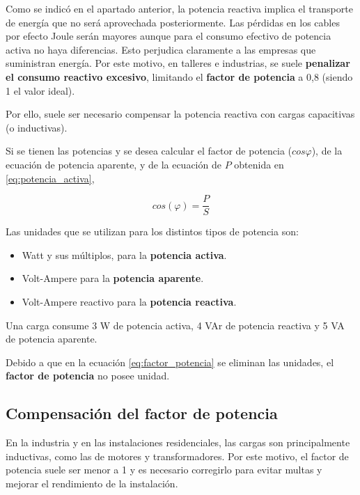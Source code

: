 Como se indicó en el apartado anterior, la potencia reactiva implica el transporte de energía que no será aprovechada posteriormente. Las pérdidas en los cables por efecto Joule serán mayores aunque para el consumo efectivo de potencia activa no haya diferencias. Esto perjudica claramente a las empresas que suministran energía. Por este motivo, en talleres e industrias, se suele \textbf{penalizar el consumo reactivo excesivo}, limitando el \textbf{factor de potencia} a 0,8 (siendo 1 el valor ideal).

Por ello, suele ser necesario compensar la potencia reactiva con cargas capacitivas (o inductivas).


Si se tienen las potencias y se desea calcular el factor de potencia ($cos \varphi$), de la ecuación de potencia aparente, y de la ecuación de $P$ obtenida en \ref{eq:potencia_activa}, 

\begin{equation}
	\label{eq:factor_potencia}
	cos(\varphi)= \frac{P}{S}
\end{equation}

Las unidades que se utilizan para los distintos tipos de potencia son:
\begin{itemize}
	\item Watt y sus múltiplos, para la \textbf{potencia activa}.
	\item Volt-Ampere para la \textbf{potencia aparente}.
	\item Volt-Ampere reactivo para la \textbf{potencia reactiva}.
\end{itemize}

\begin{ejemplo}
	Una carga consume 3 W de potencia activa, 4 VAr de potencia reactiva y 5 VA de potencia aparente.
\end{ejemplo}

Debido a que en la ecuación \ref{eq:factor_potencia} se eliminan las unidades, el \textbf{factor de potencia} no posee unidad.

\subsection{Compensación del factor de potencia}

En la industria y en las instalaciones residenciales, las cargas son principalmente inductivas, como las de motores y transformadores. Por este motivo, el factor de potencia suele ser menor a 1 y es necesario corregirlo para evitar multas y mejorar el rendimiento de la instalación.

